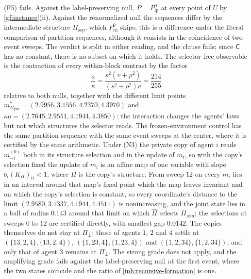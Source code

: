 (F5) fails. Against the label-preserving null, $P=P^0_{\mathrm{lp}}$ at every
point of $U$ by \cref{gf:instance}(ii). Against the renormalized null the
sequences differ by the intermediate structure $\Pi_{\mathrm{sep}}$, which
$P^0_{\mathrm{rn}}$ skips; this is a difference under the literal comparison
of partition sequences, although it consists in the coincidence of two event
sweeps. The verdict is split in either reading, and the clause fails; since
$\mathsf C$ has no constant, there is no subset on which it holds. The
selector-free observable is the contraction of every within-block contrast
by the factor
\begin{equation}
 \frac{a}{\kappa}=\frac{s^2(v+\rho^2)}{(s^2+\rho^2)v}=\frac{214}{255}
 \label{gf:contraction}
\end{equation}
relative to both nulls, together with the different limit points
$m^*_{\Pi_{\mathrm{join}}}=(2.9956,3.1556,4.2370,4.3970)$ and
$\kappa o=(2.7645,2.9551,4.1944,4.3850)$: the interaction changes the agents'
laws but not which structures the selector reads. The frozen-environment
control has the same partition sequence with the same event sweeps at the
center, where it is certified by the same arithmetic. Under (N3) the private
copy of agent $i$ reads $m^{(0)}_{-i}$ both in its structure selection and in
the update of $m_i$, so with the copy's selection fixed the update of $m_i$
is an affine map of one variable with slope $b_i(K_\Pi)_{ii}<1$, where $\Pi$ is
the copy's structure. From sweep $12$ on every $m_i$ lies in an interval
around that map's fixed point which the map leaves invariant and on which the
copy's selection is constant, so every coordinate's distance to the limit
$(2.9580,3.1337,4.1944,4.4511)$ is nonincreasing, and the joint state lies in
a ball of radius $0.143$ around that limit on which $\hat\Pi$ selects
$\Pi_{\mathrm{join}}$; the selections at sweeps $0$ to $12$ are certified
directly, with smallest gap $0.0142$. The copies themselves do not stay at
$\Pi_\perp$: those of agents $1$, $2$ and $4$ settle at
$(\{13,2,4\},\{13,2,4\})$, $(\{1,23,4\},\{1,23,4\})$ and
$(\{1,2,34\},\{1,2,34\})$, and only that of agent $3$ remains at
$\Pi_\perp$. The strong grade does
not apply, and the amplifying grade fails against the label-preserving null
at the first event, where the two states coincide and the ratio of
\cref{inh:recursive-formation} is one.

